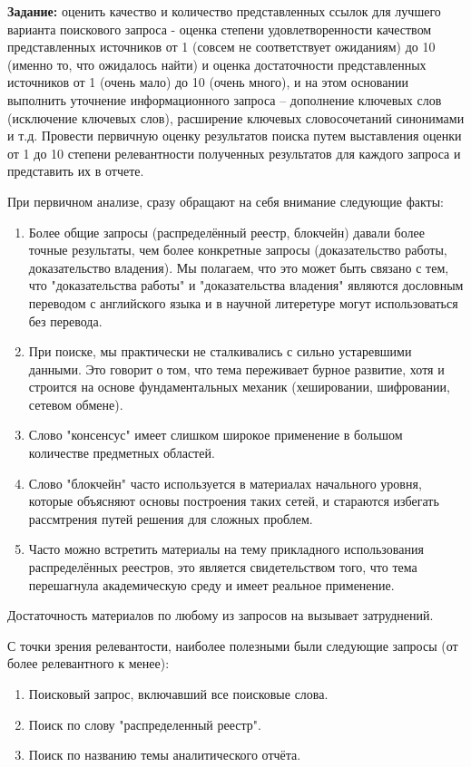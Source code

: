 \documentclass[a4paper, 12pt]{report}		%
\begin{document}
\textbf{Задание:} оценить качество и количество представленных ссылок для лучшего варианта поискового запроса - оценка степени удовлетворенности качеством представленных источников от 1 (совсем не соответствует ожиданиям) до 10 (именно то, что ожидалось найти) и оценка достаточности представленных источников от 1 (очень мало) до 10 (очень много), и на этом основании выполнить уточнение информационного запроса – дополнение ключевых слов (исключение ключевых слов), расширение ключевых словосочетаний синонимами и т.д. Провести первичную оценку результатов поиска путем выставления оценки от 1 до 10 степени релевантности полученных результатов для каждого запроса и представить их в отчете.

При первичном анализе, сразу обращают на себя внимание следующие факты:
\begin{enumerate}
\item Более общие запросы (распределённый реестр, блокчейн) давали более точные результаты, чем более конкретные запросы (доказательство работы, доказательство владения). Мы полагаем, что это может быть связано с тем, что "доказательства работы" и "доказательства владения" являются дословным переводом с английского языка и в научной литеретуре могут использоваться без перевода.
\item При поиске, мы практически не сталкивались с сильно устаревшими данными. Это говорит о том, что тема переживает бурное развитие, хотя и строится на основе фундаментальных механик (хешировании, шифровании, сетевом обмене).
\item Слово "консенсус" имеет слишком широкое применение в большом количестве предметных областей.
\item Слово "блокчейн" часто используется в материалах начального уровня, которые объясняют основы построения таких сетей, и стараются избегать рассмтрения путей решения для сложных проблем.
\item Часто можно встретить материалы на тему прикладного использования распределённых реестров, это является свидетельством того, что тема перешагнула академическую среду и имеет реальное применение.
\end{enumerate}

Достаточность материалов по любому из запросов на вызывает затруднений.

С точки зрения релевантости, наиболее полезными были следующие запросы (от более релевантного к менее):

\begin{enumerate}
\item Поисковый запрос, включавший все поисковые слова.
\item Поиск по слову "распределенный реестр".
\item Поиск по названию темы аналитического отчёта.
\end{enumerate}
\end{document}
